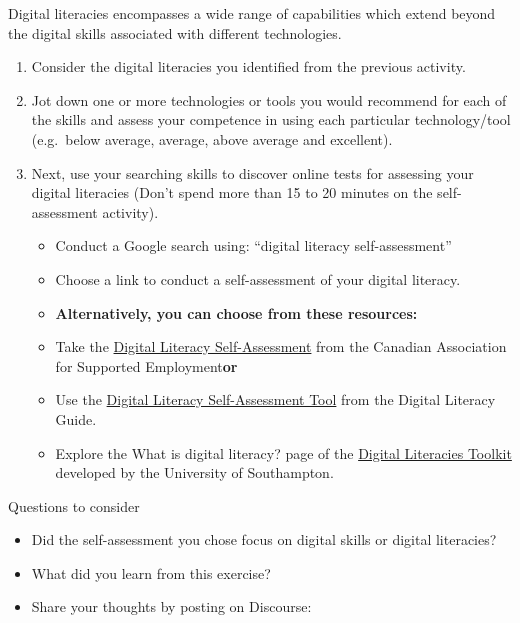 \documentclass[
]{book}
\providecommand{\tightlist}{%
  \setlength{\itemsep}{0pt}\setlength{\parskip}{0pt}}
\theoremstyle{definition}
\theoremstyle{definition}
\theoremstyle{definition}
\theoremstyle{definition}
\theoremstyle{remark}
\begin{document}
\begin{reflect}
Digital literacies encompasses a wide range of capabilities which extend beyond the digital skills associated with different technologies.

\begin{enumerate}
\def\labelenumi{\arabic{enumi}.}
\tightlist
\item
  Consider the digital literacies you identified from the previous activity.\\
\item
  Jot down one or more technologies or tools you would recommend for each of the skills and assess your competence in using each particular technology/tool (e.g.~below average, average, above average and excellent).\\
\item
  Next, use your searching skills to discover online tests for assessing your digital literacies (Don't spend more than 15 to 20 minutes on the self-assessment activity).

  \begin{itemize}
  \tightlist
  \item
    Conduct a Google search using: ``digital literacy self-assessment''\\
  \item
    Choose a link to conduct a self-assessment of your digital literacy.\\
  \item
    \textbf{Alternatively, you can choose from these resources:}\\
  \item
    Take the \href{https://supportedemployment.ca/training-and-events/certificate-programs/digital-literacy/digital-literacy-self-assessment/}{Digital Literacy Self-Assessment} from the Canadian Association for Supported Employment\textbf{or}\\
  \item
    Use the \href{https://thinkspace.csu.edu.au/digitalcitizenshipguideetl523/}{Digital Literacy Self-Assessment Tool} from the Digital Literacy Guide.
  \item
    Explore the What is digital literacy? page of the \href{https://www.elanguages.ac.uk/digital_literacies_toolkit.php}{Digital Literacies Toolkit} developed by the University of Southampton.
  \end{itemize}
\end{enumerate}

{Questions to consider}

\begin{itemize}
\tightlist
\item
  Did the self-assessment you chose focus on digital skills or digital literacies?
\item
  What did you learn from this exercise?
\item
  Share your thoughts by posting on Discourse:
\end{itemize}
\end{reflect}
\end{document}
